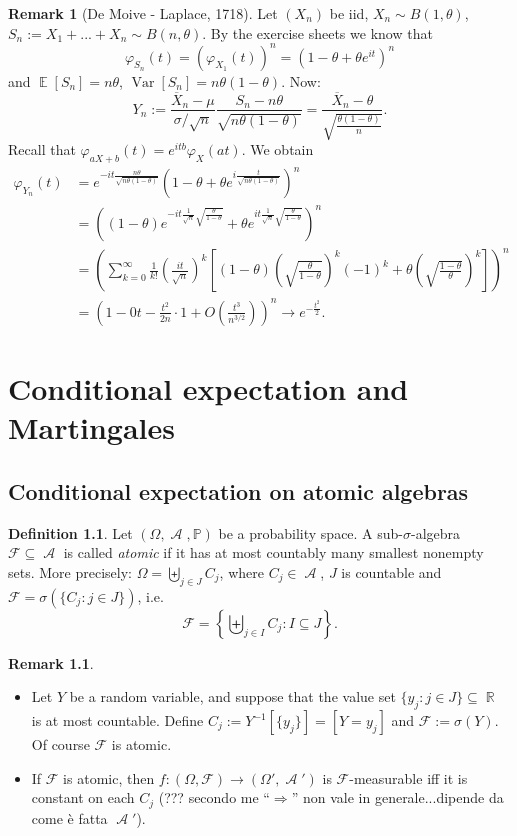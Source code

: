 \documentclass[12pt,a4paper]{report}
\theoremstyle{definition}
\newtheorem{definition}[theorem]{Definition}
\newtheorem*{remark}{Remark}
\theoremstyle{num.custom-title}
\DeclareMathOperator{\A}{\mathcal{A}}
\DeclareMathOperator{\E}{\mathbb{E}}
\DeclareMathOperator{\R}{\mathbb{R}}
\DeclareMathOperator{\Var}{Var}
\DeclareMathOperator{\imp}{\Rightarrow}
\DeclareMathOperator{\sse}{\subseteq}
\newcommand{\ol}{\overline}
\newcommand{\F}{\mathcal{F}}
\renewcommand{\phi}{\varphi}
\renewcommand{\1}{\mathbbm{1}}
\renewcommand{\P}{\mathbb{P}}
\begin{document}
\begin{remark}[De Moive - Laplace, 1718]
Let $(X_n)$ be iid, $X_n \sim B(1,\theta)$, $S_n := X_1 + ... + X_n \sim B(n,\theta)$. By the exercise sheets we know that
\[
\phi_{S_n}(t) = (\phi_{X_1}(t))^n = (1-\theta+\theta e^{it})^n
\]
and $\E[S_n]=n\theta$, $\Var[S_n] = n\theta(1-\theta)$. Now:
\[
Y_n := \frac{\ol{X}_n - \mu}{\sigma/\sqrt{n}} \frac{S_n-n\theta}{\sqrt{n\theta(1-\theta)}} = \frac{\ol{X}_n-\theta}{\sqrt{\frac{\theta(1-\theta)}{n}}}.
\]
Recall that $\phi_{aX+b}(t)=e^{itb}\phi_X(at)$. We obtain
\begin{align*}
\phi_{Y_n}(t) 
&= e^{-it \frac{n\theta}{\sqrt{n\theta(1-\theta)}}} \left( 1 - \theta + \theta e^{i \frac{t}{\sqrt{n\theta(1-\theta)}}} \right)^n \\
&= \left( (1-\theta) e^{-it \frac{1}{\sqrt{n}} \sqrt{\frac{\theta}{1-\theta}}} + \theta e^{it \frac{1}{\sqrt{n}} \sqrt{\frac{\theta}{1-\theta}}} \right)^n \\
&= \left( \sum_{k=0}^\infty \frac{1}{k!} \left( \frac{it}{\sqrt{n}} \right)^k \left[ (1-\theta) \left( \sqrt{\frac{\theta}{1-\theta}} \right)^k (-1)^k + \theta \left( \sqrt{\frac{1-\theta}{\theta}} \right)^k \right] \right)^n \\
&= \left( 1-0t - \frac{t^2}{2n} \cdot 1 + O \left( \frac{t^3}{n^{3/2}} \right) \right)^n \to e^{-\frac{t^2}{2}}.
\end{align*}
\end{remark}


\chapter{Conditional expectation and Martingales}

\section{Conditional expectation on atomic algebras}

\begin{definition}
Let $(\Omega,\A,\P)$ be a probability space. A sub-$\sigma$-algebra $\F \sse \A$ is called \emph{atomic} if it has at most countably many smallest nonempty sets. More precisely: $\Omega = \biguplus_{j \in J} C_j$, where $C_j \in \A$, $J$ is countable and $\F = \sigma(\{C_j : j \in J\})$, i.e.
\[
\F = \left\{ \biguplus_{j \in I} C_j : I \sse J \right\}.
\]
\end{definition}

\begin{remark}\ 
\begin{itemize}
\item Let $Y$ be a random variable, and suppose that the value set $\{y_j : j \in J\} \sse \R$ is at most countable. Define $C_j := Y^{-1}[\{y_j\}] = [Y=y_j]$ and $\F := \sigma(Y)$. Of course $\F$ is atomic. 
\item If $\F$ is atomic, then $f \colon (\Omega,\F) \to (\Omega',\A')$ is $\F$-measurable iff it is constant on each $C_j$ (??? secondo me ``$\imp$'' non vale in generale...dipende da come è fatta $\A'$).
\end{itemize}
\end{remark}
\end{document}
